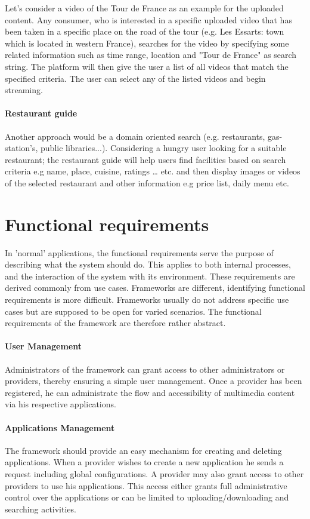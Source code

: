 Let's consider a video of the Tour de France as an example for the uploaded content. Any consumer, who is interested in a specific uploaded video that has been taken in a specific place on the road of the tour (e.g. Les Essarts: town which is located in western France), searches for the video by specifying some related information such as time range, location and "Tour de France" as search string. The platform will then give the user a list of all videos that match the specified criteria. The user can select any of the listed videos and begin streaming.

\paragraph{Restaurant guide}

Another approach would be a domain oriented search (e.g. restaurants, gas-station's, public libraries...). Considering a hungry user looking for a suitable restaurant; the restaurant guide will help users find facilities based on search criteria e.g name, place, cuisine, ratings … etc. and then display images or videos of the selected restaurant and other information e.g price list, daily menu etc.

\section{Functional requirements\label{sec:req_f_req}}

In 'normal' applications, the functional requirements serve the purpose of describing what the system should do. This applies to both internal processes, and the interaction of the system with its environment. These requirements are derived commonly from use cases. Frameworks are different, identifying functional requirements is more difficult. Frameworks usually do not address specific use cases but are supposed to be open for varied scenarios. The functional requirements of the framework are therefore rather abstract.

\paragraph{User Management}
Administrators of the framework can grant access to other administrators or providers, thereby ensuring a simple user management. Once a provider has been registered, he can administrate the flow and accessibility of multimedia content via his respective applications.

\paragraph{Applications Management}
The framework should provide an easy mechanism for creating and deleting applications. When a provider wishes to create a new application he sends a request including global configurations. A provider may also grant access to other providers to use his applications. This access either grants full administrative control over the applications or can be limited to uploading/downloading and searching activities. 

